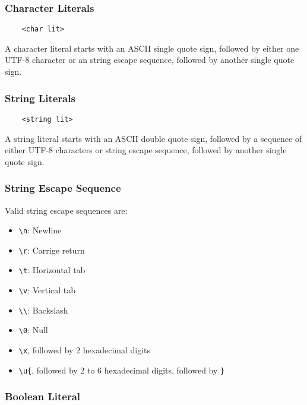 \documentclass[a4paper]{article}
\begin{document}
\subsubsection{Character Literals}

\begin{verbatim}
    <char lit>
\end{verbatim}

A character literal starts with an ASCII single quote sign, followed by either one UTF-8 character or an string escape sequence, followed by another single quote sign.

\subsubsection{String Literals}

\begin{verbatim}
    <string lit>
\end{verbatim}

A string literal starts with an ASCII double quote sign, followed by a sequence of either UTF-8 characters or string escape sequence, followed by another single quote sign.

\subsubsection{String Escape Sequence}

Valid string escape sequences are:

\begin{itemize}
    \item \verb|\n|: Newline
    \item \verb|\r|: Carrige return
    \item \verb|\t|: Horizontal tab
    \item \verb|\v|: Vertical tab
    \item \verb|\\|: Backslash
    \item \verb|\0|: Null
    \item \verb|\x|, followed by 2 hexadecimal digits
    \item \verb|\u{|, followed by 2 to 6 hexadecimal digits, followed by \verb|}|
\end{itemize}

\subsubsection{Boolean Literal}
\end{document}
